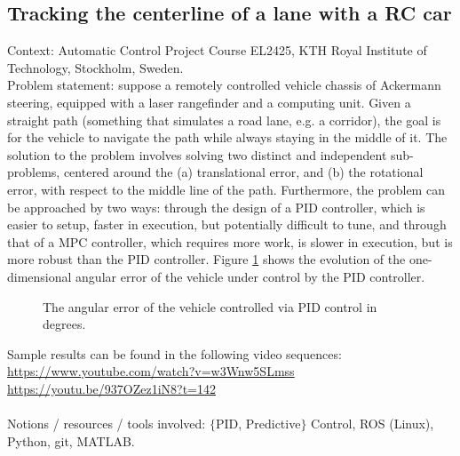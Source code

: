 \subsection{Tracking the centerline of a lane with a RC car}

Context: Automatic Control Project Course EL2425, KTH Royal Institute of
Technology, Stockholm, Sweden.\\

Problem statement: suppose a remotely controlled vehicle chassis of Ackermann
steering, equipped with a laser rangefinder and a computing unit. Given a
straight path (something that simulates a road lane, e.g. a corridor), the goal
is for the vehicle to navigate the path while always staying in the middle of it.
The solution to the problem involves solving two distinct and independent
sub-problems, centered around the (a) translational error, and (b) the
rotational error, with respect to the middle line of the path. Furthermore, the
problem can be approached by two ways: through the design of a PID controller,
which is easier to setup, faster in execution, but potentially difficult to tune,
and through that of a MPC controller, which requires more work, is slower in
execution, but is more robust than the PID controller. Figure
\ref{fig:centerline_pid_error} shows the evolution of the one-dimensional
angular error of the vehicle under control by the PID controller.

\begin{figure}[H]\centering
  \scalebox{0.6}{}
  \caption{The angular error of the vehicle controlled via PID control in degrees.}
  \label{fig:centerline_pid_error}
\end{figure}

\noindent Sample results can be found in the following video sequences:\\
\url{https://www.youtube.com/watch?v=w3Wnw5SLmss}\\
\url{https://youtu.be/937OZez1iN8?t=142}\\\\
Notions / resources / tools involved: $\{$PID, Predictive$\}$ Control, ROS (Linux), Python, git, MATLAB.
